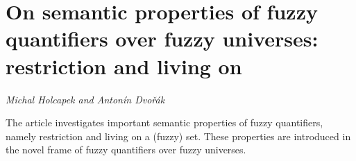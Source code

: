 \documentclass[../booklet.tex]{subfiles}
\begin{document}
\section[On semantic properties of fuzzy quantifiers over fuzzy universes:  restriction and living on. {\it Michal Holcapek and Antonín Dvořák}]{On semantic properties of fuzzy quantifiers over fuzzy universes:  restriction and living on}
 

\begin{center}
  {\it Michal Holcapek and Antonín Dvořák}
\end{center}

\vskip 0.8cm


The article investigates important semantic properties of fuzzy quantifiers, namely restriction and living on a (fuzzy) set. These properties are introduced in the novel frame of fuzzy quantifiers over fuzzy universes.

\end{document}
